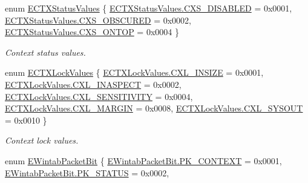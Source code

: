 \begin{DoxyCompactItemize}
enum \mbox{\hyperlink{namespace_wintab_d_n_a6d3f719c7eebc1f9b081c2d31678536e}{E\+C\+T\+X\+Status\+Values}} \{ \mbox{\hyperlink{namespace_wintab_d_n_a6d3f719c7eebc1f9b081c2d31678536ea773aec303a05b1f2bbbb72fec5c371f3}{E\+C\+T\+X\+Status\+Values.\+C\+X\+S\+\_\+\+D\+I\+S\+A\+B\+L\+ED}} = 0x0001, 
\mbox{\hyperlink{namespace_wintab_d_n_a6d3f719c7eebc1f9b081c2d31678536ea289cbc7da5860d2d8b658573790809de}{E\+C\+T\+X\+Status\+Values.\+C\+X\+S\+\_\+\+O\+B\+S\+C\+U\+R\+ED}} = 0x0002, 
\mbox{\hyperlink{namespace_wintab_d_n_a6d3f719c7eebc1f9b081c2d31678536eac9a22eca76f43903f077a73792176eb8}{E\+C\+T\+X\+Status\+Values.\+C\+X\+S\+\_\+\+O\+N\+T\+OP}} = 0x0004
 \}
\begin{DoxyCompactList}\small\item\em Context status values. \end{DoxyCompactList}\item 
enum \mbox{\hyperlink{namespace_wintab_d_n_a4ae5c9d600336cd1fe11dd04cd207c31}{E\+C\+T\+X\+Lock\+Values}} \{ \newline
\mbox{\hyperlink{namespace_wintab_d_n_a4ae5c9d600336cd1fe11dd04cd207c31ad9335c4e973a33e84061e0a1c9932419}{E\+C\+T\+X\+Lock\+Values.\+C\+X\+L\+\_\+\+I\+N\+S\+I\+ZE}} = 0x0001, 
\mbox{\hyperlink{namespace_wintab_d_n_a4ae5c9d600336cd1fe11dd04cd207c31aac7209cec3b1fde6187d8d452bfa4fe8}{E\+C\+T\+X\+Lock\+Values.\+C\+X\+L\+\_\+\+I\+N\+A\+S\+P\+E\+CT}} = 0x0002, 
\mbox{\hyperlink{namespace_wintab_d_n_a4ae5c9d600336cd1fe11dd04cd207c31a409f9e66401e8acb484ab8a8d4a7cc52}{E\+C\+T\+X\+Lock\+Values.\+C\+X\+L\+\_\+\+S\+E\+N\+S\+I\+T\+I\+V\+I\+TY}} = 0x0004, 
\mbox{\hyperlink{namespace_wintab_d_n_a4ae5c9d600336cd1fe11dd04cd207c31ab83c05435e8d81d1da9fd0a6960a6071}{E\+C\+T\+X\+Lock\+Values.\+C\+X\+L\+\_\+\+M\+A\+R\+G\+IN}} = 0x0008, 
\newline
\mbox{\hyperlink{namespace_wintab_d_n_a4ae5c9d600336cd1fe11dd04cd207c31afa00c568415836f7a8fda6c5850bab4c}{E\+C\+T\+X\+Lock\+Values.\+C\+X\+L\+\_\+\+S\+Y\+S\+O\+UT}} = 0x0010
 \}
\begin{DoxyCompactList}\small\item\em Context lock values. \end{DoxyCompactList}\item 
enum \mbox{\hyperlink{namespace_wintab_d_n_a0244b62cdae8bfd39a52f0656ae7d184}{E\+Wintab\+Packet\+Bit}} \{ \newline
\mbox{\hyperlink{namespace_wintab_d_n_a0244b62cdae8bfd39a52f0656ae7d184ab73fe0c8937280862762449f9dc791ff}{E\+Wintab\+Packet\+Bit.\+P\+K\+\_\+\+C\+O\+N\+T\+E\+XT}} = 0x0001, 
\mbox{\hyperlink{namespace_wintab_d_n_a0244b62cdae8bfd39a52f0656ae7d184a96f57de10a298069d7898a4fba27a008}{E\+Wintab\+Packet\+Bit.\+P\+K\+\_\+\+S\+T\+A\+T\+US}} = 0x0002, 

\end{DoxyCompactItemize}
